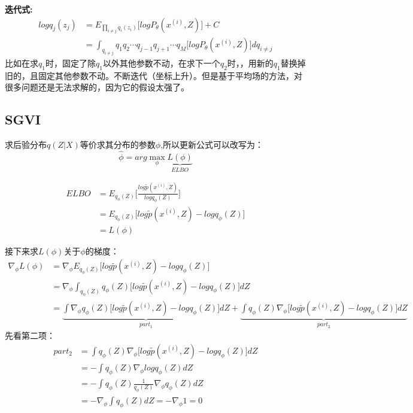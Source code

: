 \documentclass[UTF8]{ctexart} %
\begin{document}
			\textbf{迭代式:}
			\[\begin{aligned}
			logq_j(z_j) &= E_{\prod_{i\neq j} q_i(z_i)}\Big[logP_\theta(x^{(i)},Z)\Big]+C\\
			& = \int_{q_{i\neq j}}q_1q_2\cdots q_{j-1}q_{j+1}\cdots q_{M}\Big[logP_\theta(x^{(i)},Z)\Big]dq_{i\neq j}
			\end{aligned}\]
			比如在求$q_1$时，固定了除$q_1$以外其他参数不动，在求下一个$q_2$时，，用新的$q_1$替换掉旧的，且固定其他参数不动。不断迭代（坐标上升）。但是基于平均场的方法，对很多问题还是无法求解的，因为它的假设太强了。
			
			\subsection{SGVI}
				求后验分布$q(Z|X)$等价求其分布的参数$\phi$,所以更新公式可以改写为：
				\[\hat{\phi} = arg\max_{\phi}\underbrace{L(\phi)}_{ELBO}\]
				
				\[\begin{aligned}
				ELBO & = E_{q_\phi(Z)}\Big[\frac{log\tilde{p}(x^{(i)},Z)}{logq_\phi(Z)}\Big] \\
				& = E_{q_\phi(Z)}\Big[log\tilde{p}(x^{(i)},Z)-logq_\phi(Z)\Big]\\
				&=L(\phi)
				\end{aligned}\]
				
				接下来求$L(\phi)$关于$\phi$的梯度：
				\[\begin{aligned}
				\nabla_\phi L(\phi) &= \nabla_\phi  E_{q_\phi(Z)}\Big[log\tilde{p}(x^{(i)},Z)-logq_\phi(Z)\Big]\\
				&= \nabla_\phi  \int_{q_\phi(Z)}q_\phi(Z)\Big[log\tilde{p}(x^{(i)},Z)-logq_\phi(Z)\Big]dZ\\
				&= \underbrace{\int\nabla_\phi q_\phi(Z)\Big[log\tilde{p}(x^{(i)},Z)-logq_\phi(Z)\Big]dZ}_{part_1}+\underbrace{\int q_\phi(Z)\nabla_\phi\Big[log\tilde{p}(x^{(i)},Z)-logq_\phi(Z)\Big]dZ}_{part_2}
				\end{aligned}\]
				先看第二项：
				\[\begin{aligned}
				part_2& =\int q_\phi(Z)\nabla_\phi\Big[log\tilde{p}(x^{(i)},Z)-logq_\phi(Z)\Big]dZ\\
				&= -\int q_\phi(Z) \nabla_\phi logq_\phi(Z)dZ\\
				&= -\int q_\phi(Z)\frac{1}{q_\phi(Z)}\nabla_\phi q_\phi(Z)dZ\\
				& = -\nabla_\phi\int q_\phi(Z)dZ = -\nabla_\phi 1 = 0
				\end{aligned} \]
				
\end{document}
